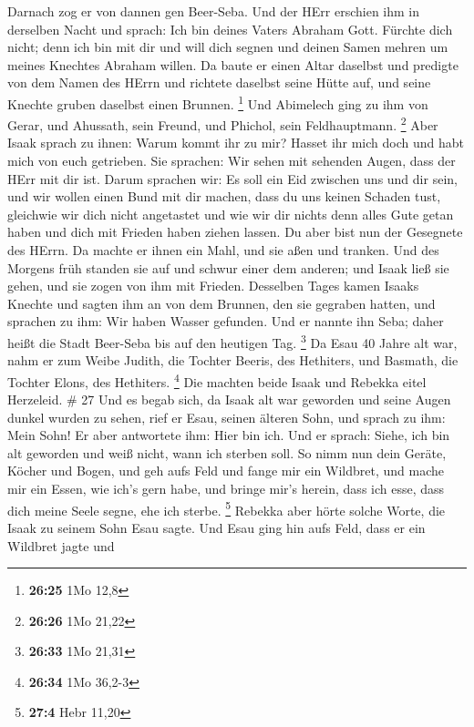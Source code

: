 Darnach zog er von dannen gen Beer-Seba.  Und der HErr
erschien ihm in derselben Nacht und sprach: Ich bin deines Vaters
Abraham Gott. Fürchte dich nicht; denn ich bin mit dir und will dich
segnen und deinen Samen mehren um meines Knechtes Abraham willen.
 Da baute er einen Altar daselbst und predigte von dem
Namen des HErrn und richtete daselbst seine Hütte auf, und seine Knechte
gruben daselbst einen Brunnen. \footnote{\textbf{26:25} 1Mo 12,8}
 Und Abimelech ging zu ihm von Gerar, und Ahussath, sein
Freund, und Phichol, sein Feldhauptmann. \footnote{\textbf{26:26} 1Mo
  21,22}  Aber Isaak sprach zu ihnen: Warum kommt ihr zu
mir? Hasset ihr mich doch und habt mich von euch getrieben.
 Sie sprachen: Wir sehen mit sehenden Augen, dass der HErr
mit dir ist. Darum sprachen wir: Es soll ein Eid zwischen uns und dir
sein, und wir wollen einen Bund mit dir machen,  dass du
uns keinen Schaden tust, gleichwie wir dich nicht angetastet und wie wir
dir nichts denn alles Gute getan haben und dich mit Frieden haben ziehen
lassen. Du aber bist nun der Gesegnete des HErrn.  Da
machte er ihnen ein Mahl, und sie aßen und tranken.  Und
des Morgens früh standen sie auf und schwur einer dem anderen; und Isaak
ließ sie gehen, und sie zogen von ihm mit Frieden. 
Desselben Tages kamen Isaaks Knechte und sagten ihm an von dem Brunnen,
den sie gegraben hatten, und sprachen zu ihm: Wir haben Wasser gefunden.
 Und er nannte ihn Seba; daher heißt die Stadt Beer-Seba
bis auf den heutigen Tag. \footnote{\textbf{26:33} 1Mo 21,31}
 Da Esau 40 Jahre alt war, nahm er zum Weibe Judith, die
Tochter Beeris, des Hethiters, und Basmath, die Tochter Elons, des
Hethiters. \footnote{\textbf{26:34} 1Mo 36,2-3}  Die
machten beide Isaak und Rebekka eitel Herzeleid. \# 27  Und
es begab sich, da Isaak alt war geworden und seine Augen dunkel wurden
zu sehen, rief er Esau, seinen älteren Sohn, und sprach zu ihm: Mein
Sohn! Er aber antwortete ihm: Hier bin ich.  Und er sprach:
Siehe, ich bin alt geworden und weiß nicht, wann ich sterben soll.
 So nimm nun dein Geräte, Köcher und Bogen, und geh aufs
Feld und fange mir ein Wildbret,  und mache mir ein Essen,
wie ich's gern habe, und bringe mir's herein, dass ich esse, dass dich
meine Seele segne, ehe ich sterbe. \footnote{\textbf{27:4} Hebr 11,20}
 Rebekka aber hörte solche Worte, die Isaak zu seinem Sohn
Esau sagte. Und Esau ging hin aufs Feld, dass er ein Wildbret jagte und

